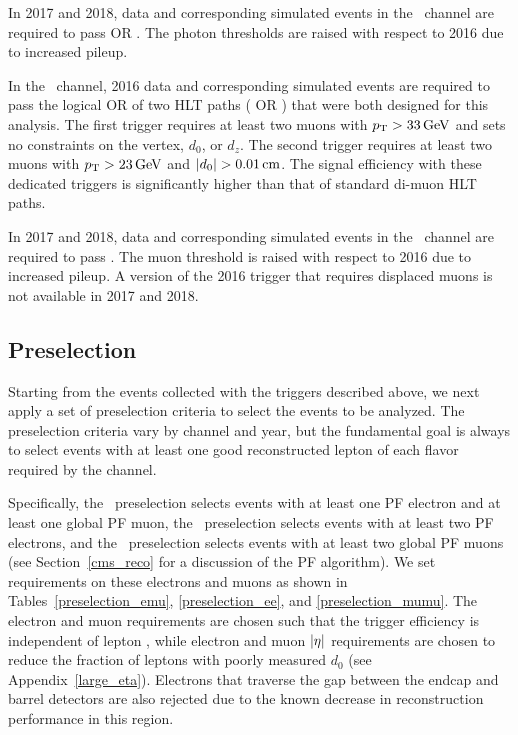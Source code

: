 In 2017 and 2018, data and corresponding simulated events in the \Pe\Pe\ channel are required to pass  OR  . The photon \ET thresholds are raised with respect to 2016 due to increased pileup.

In the \Pgm\Pgm\ channel, 2016 data and corresponding simulated events are required to pass the logical OR of two HLT paths ( OR ) that were both designed for this analysis. The first trigger requires at least two muons with $\pt>\SI{33}{\GeV}$ and sets no constraints on the vertex, $d_0$, or $d_z$. The second trigger requires at least two muons with $\pt>\SI{23}{\GeV}$ and $\ad>\SI{0.01}{\cm}$. The signal efficiency with these dedicated triggers is significantly higher than that of standard di-muon HLT paths.

In 2017 and 2018, data and corresponding simulated events in the \Pgm\Pgm\ channel are required to pass . The muon \pt threshold is raised with respect to 2016 due to increased pileup. A version of the 2016 trigger that requires displaced muons is not available in 2017 and 2018.

\subsection{Preselection}
\label{preselection}
Starting from the events collected with the triggers described above, we next apply a set of preselection criteria to select the events to be analyzed. The preselection criteria vary by channel and year, but the fundamental goal is always to select events with at least one good reconstructed lepton of each flavor required by the channel. 

Specifically, the \Pe\Pgm\ preselection selects events with at least one PF electron and at least one global PF muon, the \Pe\Pe\ preselection selects events with at least two PF electrons, and the \Pgm\Pgm\ preselection selects events with at least two global PF muons (see Section~\ref{cms_reco} for a discussion of the PF algorithm). We set requirements on these electrons and muons as shown in Tables~\ref{preselection_emu}, \ref{preselection_ee}, and \ref{preselection_mumu}. The electron and muon \pt  requirements are chosen such that the trigger efficiency is independent of lepton \pt, while electron and muon $\lvert \eta \rvert$ requirements are chosen to reduce the fraction of leptons with poorly measured $d_0$ (see Appendix~\ref{large_eta}). Electrons that traverse the gap between the endcap and barrel detectors are also rejected due to the known decrease in reconstruction performance in this region.

